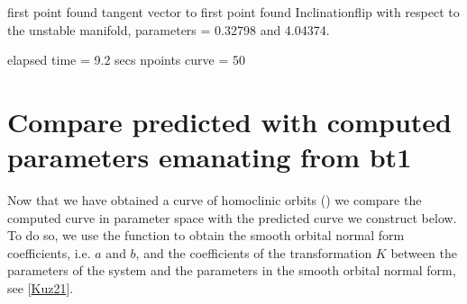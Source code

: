 \documentclass[letterpaper,10pt,english]{jupyterBook}
\begin{document}
\begin{sphinxVerbatim}[commandchars=\\\{\}]
\PYG{p}{[}\PYG{p}{]}
\end{sphinxVerbatim}

\begin{sphinxVerbatim}[commandchars=\\\{\}]
first point found
tangent vector to first point found
Inclination\PYGZhy{}flip with respect to the unstable manifold, parameters = 0.32798 and 4.04374.

elapsed time  = 9.2 secs
npoints curve = 50
\end{sphinxVerbatim}


\section{Compare predicted with computed parameters emanating from bt1}
\label{\detokenize{HomoclinicRGflows:compare-predicted-with-computed-parameters-emanating-from-bt1}}
\sphinxAtStartPar
Now that we have obtained a curve of homoclinic orbits () we
compare the computed curve in parameter space with the predicted curve we
construct below. To do so, we use the function  to obtain the
smooth orbital normal form coefficients, i.e. \(a\) and \(b\), and the coefficients
of the transformation \(K\) between the parameters of the system and the parameters
in the smooth orbital normal form, see {[}\hyperlink{cite.references:id3}{Kuz21}{]}.
\end{document}
